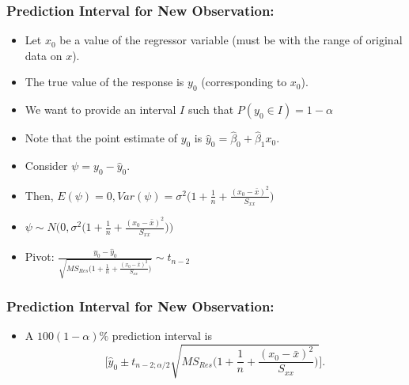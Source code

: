 \documentclass[10pt]{beamer} %
\begin{document}
\begin{frame}
	\frametitle{Prediction Interval for New Observation:  }
\begin{itemize}
\item Let $x_0$ be a value of the regressor variable (must be with the range of original data on $x$).
	\vspace{0.2cm}

\item The true value of the response is $y_0$ (corresponding to $x_0$). 

	\vspace{0.2cm}

\item We want to provide an interval $I$ such that $P(y_0 \in I) = 1 -\alpha$

	\vspace{0.2cm}

\item Note that the point estimate of $y_0$ is $\hat y_0 = \hat\beta_0 + \hat\beta_1 x_0$.

	\vspace{0.2cm}

\item Consider $ \psi = y_0 - \hat y_0$. 

	\vspace{0.2cm}

\item Then, $E(\psi) = 0, Var(\psi) =  \sigma^2\Big(1 + \frac{1}{n} + \frac{(x_0 -\bar{x})^2}{S_{xx}}\Big)$
\vspace{0.2cm}

\item $\psi \sim N \Bigg(0, \sigma^2\Big(1 + \frac{1}{n} + \frac{(x_0 -\bar{x})^2}{S_{xx}}\Big)  \Bigg)$

\vspace{0.2cm}

\item Pivot: $\frac{y_0 - \hat y_0}{\sqrt{MS_{Res}\Big(1 + \frac{1}{n} + \frac{(x_0 -\bar{x})^2}{S_{xx}}\Big)}} \sim t_{n-2} $
\end{itemize}	
	
\end{frame}


\begin{frame}
	\frametitle{Prediction Interval for New Observation:  }
\begin{itemize}
\item A $100(1-\alpha)\%$ prediction interval is
$$\Bigg[\hat y_0 \pm t_{n-2; \alpha/2} \sqrt{MS_{Res}\Big(1 + \frac{1}{n} + \frac{(x_0 -\bar{x})^2}{S_{xx}}\Big)}  \Bigg]. $$
\end{itemize}	
	
\end{frame}
\end{document}
